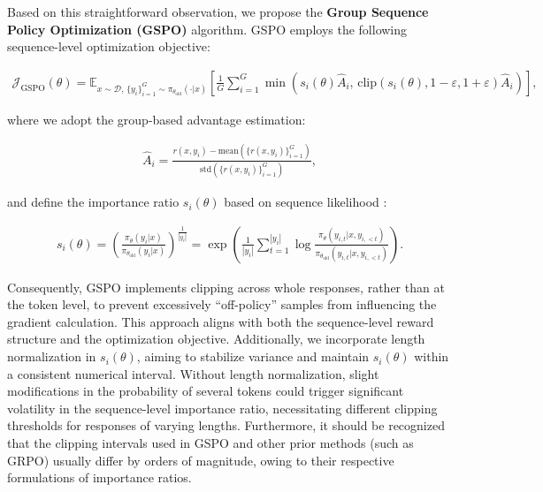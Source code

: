 Based on this straightforward observation, we propose the \textbf{Group Sequence Policy Optimization (GSPO)} algorithm. GSPO employs the following sequence-level optimization objective:

\begin{align}
\mathcal{J}_\text{GSPO} (\theta) =
\mathbb{E}_{ x \sim \mathcal{D},\, \{y_i\}_{i=1}^G \sim \pi_{\theta_\text{old}}( \cdot | x) }
\left[ 
\frac{1}{G} \sum_{i=1}^{G}
\min \left( s_{i}(\theta)  \widehat{A}_{i},  \, \mathrm{clip} \left( s_{i}(\theta), 1 - {\varepsilon}, 1 + {\varepsilon} \right) \widehat{A}_{i} \right) 
\right],
\label{equ:gspo}
\end{align}

where we adopt the group-based advantage estimation:

\begin{align}
\widehat{A}_{i} = \frac{r(x, y_i) - \mathrm{mean} \left( \{ r(x, y_i) \}_{i=1}^G \right) }{ \mathrm{std} \left( \{ r(x, y_i) \}_{i=1}^G \right) },
\end{align}

and define the importance ratio $s_{i}(\theta)$ based on sequence likelihood \citep{click}:

\begin{align}
s_{i}(\theta) = \left( \frac{ \pi_{\theta} (y_i | x) }{ \pi_{\theta_\text{old}} (y_i | x)} \right)^{\frac{1}{|y_i|}}
=
\exp \left( \frac{1}{|y_i|} \sum_{t=1}^{|y_i|} \log \frac{ \pi_{\theta} (y_{i,t} | x, y_{i,<t}) }{ \pi_{\theta_\text{old}} (y_{i,t} | x,y_{i,<t})} \right).
\end{align}

Consequently, GSPO implements clipping across whole responses, rather than at the token level, to prevent excessively ``off-policy'' samples from influencing the gradient calculation. This approach aligns with both the sequence-level reward structure and the optimization objective. Additionally, we incorporate length normalization in $s_{i}(\theta)$, aiming to stabilize variance and maintain $s_{i}(\theta)$ within a consistent numerical interval. Without length normalization, slight modifications in the probability of several tokens could trigger significant volatility in the sequence-level importance ratio, necessitating different clipping thresholds for responses of varying lengths. Furthermore, it should be recognized that the clipping intervals used in GSPO and other prior methods (such as GRPO) usually differ by orders of magnitude, owing to their respective formulations of importance ratios.

